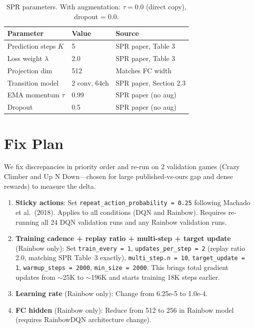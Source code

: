 \documentclass[11pt]{article}
\begin{document}
\begin{table}[H]
\centering
\small
\renewcommand{\arraystretch}{1.5}
\setlength{\tabcolsep}{5pt}
\begin{tabular}{l l l}
\toprule
\textbf{Parameter} & \textbf{Value} & \textbf{Source} \\
\midrule
Prediction steps $K$ & 5            & SPR paper, Table 3 \\
Loss weight $\lambda$& 2.0          & SPR paper, Table 3 \\
Projection dim       & 512          & Matches FC width \\
Transition model     & 2 conv, 64ch & SPR paper, Section 2.3 \\
EMA momentum $\tau$  & 0.99         & SPR paper (no aug) \\
Dropout              & 0.5          & SPR paper (no aug) \\
\bottomrule
\end{tabular}
\caption{SPR parameters. With augmentation: $\tau = 0.0$ (direct
copy), dropout = 0.0.}
\label{tab:spr-params}
\end{table}

\section{Fix Plan}
\label{sec:fix-plan}

We fix discrepancies in priority order and re-run on 2 validation
games (Crazy Climber and Up N Down---chosen for large
published-vs-ours gap and dense rewards) to measure the delta.

\medskip
\begin{enumerate}[leftmargin=2em, itemsep=0.5em]
  \item \textbf{Sticky actions}: Set
    \texttt{repeat\_action\_probability = 0.25} following Machado
    et al.\ (2018). Applies to all conditions (DQN and Rainbow).
    Requires re-running all 24 DQN validation runs and any Rainbow
    validation runs.
  \item \textbf{Training cadence + replay ratio + multi-step +
    target update} (Rainbow only): Set \texttt{train\_every = 1},
    \texttt{updates\_per\_step = 2} (replay ratio 2.0, matching SPR
    Table~3 exactly), \texttt{multi\_step.n = 10},
    \texttt{target\_update = 1}, \texttt{warmup\_steps = 2000},
    \texttt{min\_size = 2000}. This brings total gradient updates
    from $\sim$25K to $\sim$196K and starts training 18K steps
    earlier.
  \item \textbf{Learning rate} (Rainbow only): Change from 6.25e-5
    to 1.0e-4.
  \item \textbf{FC hidden} (Rainbow only): Reduce from 512 to 256
    in Rainbow model (requires RainbowDQN architecture change).
\end{enumerate}
\end{document}

